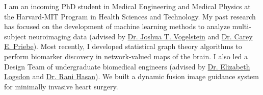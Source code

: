 \documentclass[11pt, letterpaper, sans, citecolor=blue, colorlinks=true, urlcolor=blue]{moderncv}
\begin{document}
\makecvtitle
\vspace*{-1.5\baselineskip}
I am an incoming PhD student in Medical Engineering and Medical Physics at the Harvard-MIT Program in Health Sciences and Technology. My past research has focused on the development of machine learning methods to analyze multi-subject neuroimaging data (advised by \href{https://jovo.me}{Dr. Joshua T. Vogelstein} and \href{https://www.ams.jhu.edu/~priebe/}{Dr. Carey E. Priebe}). Most recently, I developed statistical graph theory algorithms to perform biomarker discovery in network-valued maps of the brain. I also led a Design Team of undergraduate biomedical engineers (advised by \href{https://www.bme.jhu.edu/people/faculty/elizabeth-logsdon/}{Dr. Elizabeth Logsdon} and \href{https://www.hopkinsmedicine.org/profiles/results/directory/profile/1571333/rani-hasan}{Dr. Rani Hasan}). 
We built a dynamic fusion image guidance system for minimally invasive heart surgery.


% 




% 

\end{document}
